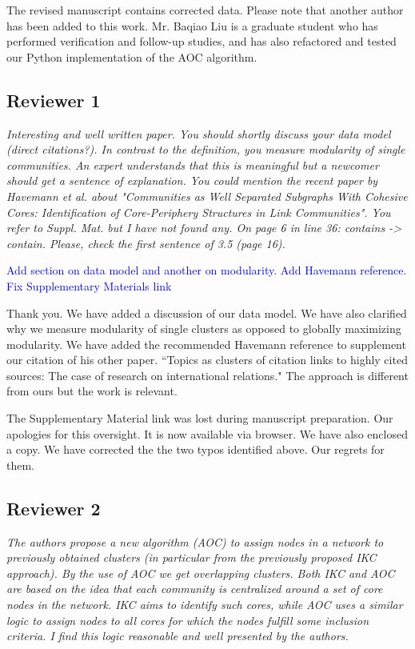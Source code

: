 \documentclass[11pt, oneside]{article}   	%
\begin{document}
\noindent The revised manuscript contains corrected data. Please note that another author has been added to this work. Mr. Baqiao Liu is a graduate student who has performed verification and follow-up studies, and 
has also refactored and tested our Python implementation of the AOC algorithm.


\subsection*{Reviewer 1} \emph{Interesting and well written paper. You should shortly discuss your data model (direct citations?). In contrast to the definition, you measure modularity of single communities. An expert understands that this is meaningful but a newcomer should get a sentence of explanation.  You could mention the recent paper by Havemann et al. about "Communities as Well Separated Subgraphs With Cohesive Cores: Identification of Core-Periphery Structures in Link Communities". You refer to Suppl. Mat. but I have not found any. On page 6 in line 36: contains -> contain. Please, check the first sentence of 3.5 (page 16).}

\textcolor{blue}{Add section on data model and another on modularity. Add Havemann reference. Fix Supplementary Materials link}

\vspace{4 mm}
Thank you. We have added a discussion of our data model. We have also clarified why we measure modularity of single clusters as opposed to globally maximizing modularity. We have added the recommended 
Havemann reference to supplement our citation of his other paper. ``Topics as clusters of citation links to highly cited sources: The case of research on international relations." The approach is different from 
ours but the work is relevant.

The Supplementary Material link was lost during manuscript preparation. Our apologies for this oversight. It is now available via browser. We have also enclosed a copy. We have corrected the the two typos identified
above. Our regrets for them.

\clearpage

\subsection*{Reviewer 2} \emph{The authors propose a new algorithm (AOC) to assign nodes in a network to previously obtained clusters (in particular from the previously proposed IKC approach). By the use of AOC we get overlapping clusters. Both IKC and AOC are based on the idea that each community is centralized around a set of core nodes in the network. IKC aims to identify such cores, while AOC uses a similar logic to assign nodes to all cores for which the nodes fulfill some inclusion criteria. I find this logic reasonable and well presented by the authors.} 
\end{document}
